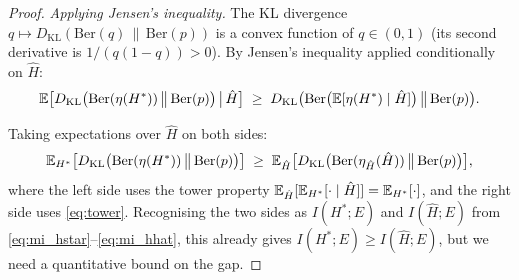 \begin{proof}
\emph{Applying Jensen's inequality.}
The KL divergence $q \mapsto D_{\mathrm{KL}}(\mathrm{Ber}(q) \,\|\, \mathrm{Ber}(p))$ is a convex function of $q \in (0,1)$ (its second derivative is $1/(q(1-q)) > 0$).
By Jensen's inequality applied conditionally on $\hat{H}$:
\begin{equation}
\label{eq:jensen}
\mathbb{E}\bigl[D_{\mathrm{KL}}\bigl(\mathrm{Ber}(\eta(H^*))\,\big\|\,\mathrm{Ber}(p)\bigr) \,\big|\, \hat{H}\bigr]
\;\geq\;
D_{\mathrm{KL}}\bigl(\mathrm{Ber}\bigl(\mathbb{E}[\eta(H^*) \mid \hat{H}]\bigr)\,\big\|\,\mathrm{Ber}(p)\bigr).
\end{equation}

Taking expectations over $\hat{H}$ on both sides:
\begin{equation}
\label{eq:jensen_full}
\mathbb{E}_{H^*}\bigl[D_{\mathrm{KL}}\bigl(\mathrm{Ber}(\eta(H^*))\,\big\|\,\mathrm{Ber}(p)\bigr)\bigr]
\;\geq\;
\mathbb{E}_{\hat{H}}\bigl[D_{\mathrm{KL}}\bigl(\mathrm{Ber}(\eta_{\hat{H}}(\hat{H}))\,\big\|\,\mathrm{Ber}(p)\bigr)\bigr],
\end{equation}
where the left side uses the tower property $\mathbb{E}_{\hat{H}}[\mathbb{E}_{H^*}[\cdot \mid \hat{H}]] = \mathbb{E}_{H^*}[\cdot]$, and the right side uses \eqref{eq:tower}.
Recognising the two sides as $I(H^*; E)$ and $I(\hat{H}; E)$ from \eqref{eq:mi_hstar}--\eqref{eq:mi_hhat}, this already gives $I(H^*; E) \geq I(\hat{H}; E)$, but we need a quantitative bound on the gap.


\end{proof}
